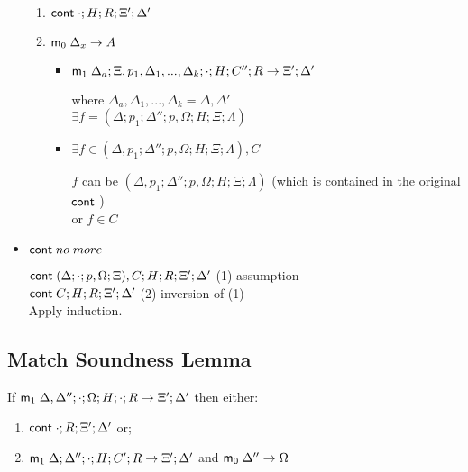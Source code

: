 \begin{itemize}
   \begin{enumerate}
      \item $\mathsf{cont} \; \cdot; H; R; \Xi'; \Delta'$
      
      \item $\mathsf{m}_0 \; \Delta_x \rightarrow A$
      \begin{itemize}
         \item $\mathsf{m}_1 \; \Delta_a; \Xi, p_1, \Delta_1, ..., \Delta_k; \cdot; H; C''; R \rightarrow \Xi'; \Delta'$ 
      
         where $\Delta_a, \Delta_1, ..., \Delta_k = \Delta, \Delta'$ \\
      
         $\exists f = (\Delta; p_1; \Delta''; p, \Omega; H; \Xi; \Lambda)$
      
         \item $\exists f \in (\Delta, p_1; \Delta''; p, \Omega; H; \Xi; \Lambda), C$
      
         $f$ can be $(\Delta, p_1; \Delta''; p, \Omega; H; \Xi; \Lambda)$ (which is contained in the original $\mathsf{cont} \;$)\\
         or $f \in C$\\
      \end{itemize}
   \end{enumerate}
   
   \item $\mathsf{cont} \; no \; more$
   
   $\mathsf{cont} \; (\Delta; \cdot; p, \Omega; \Xi), C; H; R; \Xi'; \Delta'$ \hfill (1) assumption \\
   $\mathsf{cont} \; C; H; R; \Xi'; \Delta'$ \hfill (2) inversion of (1) \\
   
   Apply induction.
\end{itemize}

\subsection{Match Soundness Lemma}

If $\mathsf{m}_1 \; \Delta, \Delta''; \cdot; \Omega; H; \cdot; R \rightarrow \Xi'; \Delta'$ then either:\\
\begin{enumerate}
   \item $\mathsf{cont} \; \cdot; R; \Xi'; \Delta'$ or;
   \item $\mathsf{m}_1 \; \Delta; \Delta''; \cdot; H; C'; R \rightarrow \Xi'; \Delta'$ and $\mathsf{m}_0 \; \Delta'' \rightarrow \Omega$
\end{enumerate}

